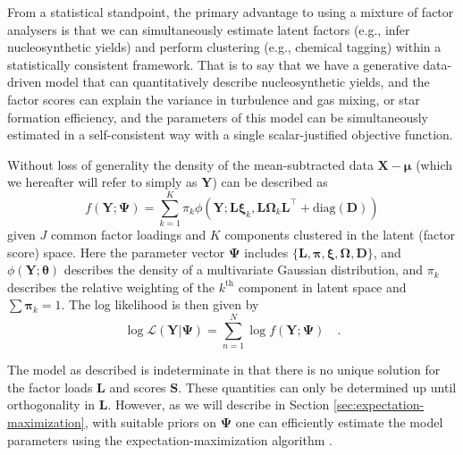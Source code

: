 \documentclass[twocolumn]{aastex62}
\newcommand{\vect}[1]{\boldsymbol{\mathbf{#1}}}
\renewcommand{\vec}[1]{\vect{#1}}
\newcommand{\weight}{\pi}
\newcommand{\data}{\textbf{Y}}
\newcommand{\vecdata}{\vec\data}
\newcommand{\vecdataunscaled}{\vec{X}}
\newcommand{\diag}[1]{\textrm{diag}(#1)}
\newcommand{\transpose}{^\intercal}
\newcommand{\factorloads}{\textbf{L}}
\newcommand{\factorscores}{\textbf{S}}
\newcommand{\specificvariance}{\vec{D}}
\newcommand{\scoremeans}{\vec\xi}
\newcommand{\scorecovs}{\vec\Omega}
\newcommand{\NumData}{N}
\newcommand{\numdata}{n}
\newcommand{\NumLatentFactors}{J}
\newcommand{\NumComponents}{K}
\newcommand{\numcomponents}{k}
\begin{document}
From a statistical standpoint, the primary advantage to using
a mixture of factor analysers is that we can simultaneously
estimate latent factors (e.g., infer nucleosynthetic 
yields) and perform clustering (e.g., chemical tagging) 
within a statistically consistent framework. That is to say
that we have a generative data-driven model that can 
quantitatively describe nucleosynthetic yields, and the
factor scores can explain the variance in turbulence and gas mixing,
or star formation efficiency, and the parameters of this model
can be simultaneously estimated in a self-consistent way with
a single scalar-justified objective function.

Without loss of generality the density of the mean-subtracted 
data $\vecdataunscaled - \vec\mu$ (which we hereafter will refer to simply as $\vecdata$) can be described as 
\begin{equation}
	f(\vecdata; \vec\Psi) = \sum_{\numcomponents=1}^{\NumComponents}\weight_\numcomponents\phi(\vecdata;\factorloads\scoremeans_\numcomponents, \factorloads\scorecovs_\numcomponents\factorloads\transpose + \diag{\specificvariance})
\end{equation}
\noindent{}given $\NumLatentFactors$ common factor loadings and $\NumComponents$ components
clustered in the latent (factor score) space. Here the parameter
vector
$\vec\Psi$ includes $\{\factorloads,\vec\pi,\scoremeans,\scorecovs,\specificvariance\}$, and $\phi(\vecdata; \vec\theta)$
describes the density of a multivariate Gaussian distribution,
and $\weight_\numcomponents$ describes the relative weighting of the $\numcomponents^\mathrm{th}$
component in latent space and $\sum\vec\weight_{\numcomponents} = 1$.
The log likelihood is then given by
\begin{equation}
	\log\mathcal{L}(\vecdata|\vec\Psi) = \sum_{\numdata=1}^{\NumData}\log{f(\vecdata;\vec\Psi)} \quad . \label{eq:log-likelihood}
\end{equation}


The model as described is indeterminate in that there is no unique 
solution for the factor loads $\factorloads$ and scores
$\factorscores$. These quantities can only be determined up until 
orthogonality in $\factorloads$. However, as we will describe in Section \ref{sec:expectation-maximization}, with suitable priors on $\vec\Psi$ 
one can efficiently estimate the model parameters using the expectation-maximization
algorithm \citep{Dempster:1977}. 

\vspace{1em}
\end{document}

